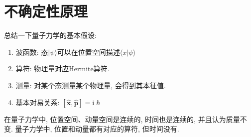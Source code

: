     \section{不确定性原理}
        总结一下量子力学的基本假设: 
        \begin{enumerate}
            \item 波函数: 态$|\psi \rangle$可以在位置空间描述$\langle x|\psi\rangle$
            \item 算符: 物理量对应Hermite算符.
            \item 测量: 对某个态测量某个物理量, 会得到其本征值.
            \item 基本对易关系: $[\hat{\bm{x}},\hat{\bm{p}}] = \mathrm{i}\hslash$
        \end{enumerate}
        在量子力学中, 位置空间、动量空间是连续的, 时间也是连续的, 并且认为质量不变. 
        量子力学中, 位置和动量都有对应的算符, 但时间没有.

